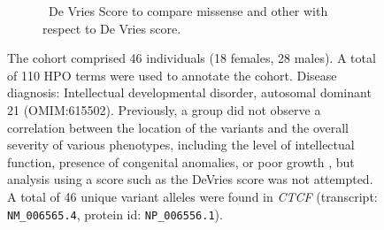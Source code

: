 \begin{figure}[htbp]
\vspace{2em}

\begin{subfigure}[b]{0.95\textwidth}
\captionsetup{justification=raggedright,singlelinecheck=false}
\caption{ De Vries Score to compare missense and other with respect to De Vries score. }
\end{subfigure}

\vspace{2em}

\caption{The cohort comprised 46 individuals (18 females, 28 males). A total of 110 HPO terms were used to annotate the cohort. 
Disease diagnosis: Intellectual developmental disorder, autosomal dominant 21 (OMIM:615502). Previously, a group
did not observe a correlation between the location of the variants and the overall severity of various phenotypes, 
including the level of intellectual function, presence of congenital anomalies, or poor growth \cite{PMID_36454652},
but analysis using a score such as the DeVries score was not attempted.
A total of 46 unique variant alleles were found in \textit{CTCF} (transcript: \texttt{NM\_006565.4}, protein id: \texttt{NP\_006556.1}).}
\end{figure}
